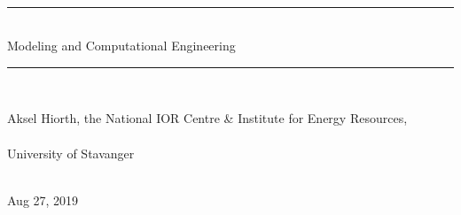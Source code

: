 \documentclass[graybox,sectrefs,envcountresetchap,open=right,final]{svmonodo}
\begin{document}

\newcommand{\exercisesection}[1]{\subsection*{#1}}






\frontmatter
\setcounter{page}{3}
\pagestyle{headings}



\thispagestyle{empty}
\hbox{\ \ }
\vfill
\begin{center}
{\huge{\bfseries{
\begin{spacing}{1.25}
{\rule{\linewidth}{0.5mm}} \\[0.4cm]
{Modeling and Computational Engineering }
\\[0.4cm] {\rule{\linewidth}{0.5mm}} \\[1.5cm]
\end{spacing}
}}}


\vspace{0.5cm}

{\Large\textsf{Aksel Hiorth, the National IOR Centre {\&} Institute for Energy Resources,${}^{}$}}\\ [3mm]

\ \\ [2mm]

University of Stavanger

\ \\ [10mm]
{\large\textsf{Aug 27, 2019}}

\end{center}
\vfill
\clearpage

\setpagesize
\end{document}
